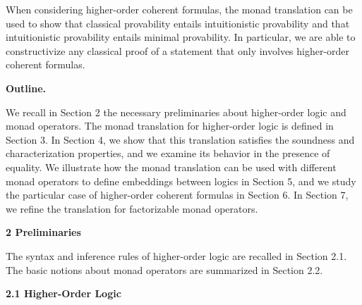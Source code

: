  
 
When considering higher-order coherent formulas, the monad translation can be used to show that classical provability entails intuitionistic provability and that intuitionistic provability entails minimal provability. In particular, we are able to constructivize any classical proof of a statement that only involves higher-order coherent formulas.\par
 
 
 
 
\par\medskip\noindent\textbf{Outline.}\par
 
 
We recall in Section 2 the necessary preliminaries about higher-order logic and monad operators. The monad translation for higher-order logic is defined in Section 3. In Section 4, we show that this translation satisfies the soundness and characterization properties, and we examine its behavior in the presence of equality. We illustrate how the monad translation can be used with different monad operators to define embeddings between logics in Section 5, and we study the particular case of higher-order coherent formulas in Section 6. In Section 7, we refine the translation for factorizable monad operators.\par
 
 
 


 
\par\medskip\noindent\textbf{2 Preliminaries}\par
 
 
The syntax and inference rules of higher-order logic are recalled in Section 2.1. The basic notions about monad operators are summarized in Section 2.2.\par
 
 
 
\par\medskip\noindent\textbf{2.1 Higher-Order Logic}\par
 
